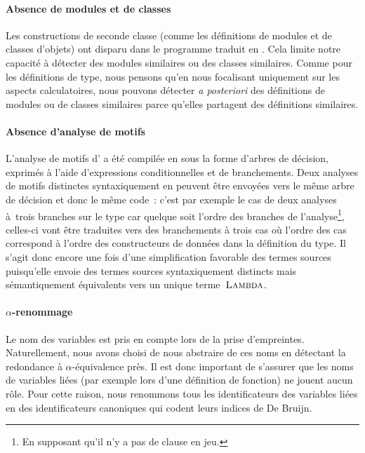 \paragraph{Absence de modules et de classes}
Les constructions de seconde classe (comme les définitions de modules
et de classes d'objets) ont disparu dans le programme traduit en
{\LambdaCode}. Cela limite notre capacité à détecter des modules
similaires ou des classes similaires. Comme pour les définitions de
type, nous pensons qu'en nous focalisant uniquement sur les aspects
calculatoires, nous pouvons détecter \textit{a posteriori} des
définitions de modules ou de classes similaires parce qu'elles
partagent des définitions similaires.

\paragraph{Absence d'analyse de motifs}
L'analyse de motifs d'{\OCaml} a été compilée en {\LambdaCode} sous la
forme d'arbres de décision, exprimés à l'aide d'expressions
conditionnelles et de branchements. Deux analyses de motifs distinctes
syntaxiquement en {\OCaml} peuvent être envoyées vers le même arbre de
décision et donc le même code~\LambdaCode: c'est par exemple le cas de deux
analyses à~trois branches sur le type  car quelque soit l'ordre des branches de
l'analyse\footnote{En supposant qu'il n'y a pas de clause
   en jeu.}, celles-ci vont être traduites vers des
branchements à trois cas où l'ordre des cas correspond à l'ordre des
constructeurs de données dans la définition du type. Il s'agit donc
encore une fois d'une simplification favorable des termes sources
puisqu'elle envoie des termes sources syntaxiquement distincts mais
sémantiquement équivalents vers un unique terme~$\textsc{Lambda}$.

\paragraph{$\alpha$-renommage}

Le nom des variables est pris en compte lors de la prise d'empreintes.
Naturellement, nous avons choisi de nous abstraire de ces noms en
détectant la redondance à $\alpha$-équivalence près. Il est donc
important de s'assurer que les noms de variables liées (par exemple
lors d'une définition de fonction) ne jouent aucun rôle. Pour cette
raison, nous renommons tous les identificateurs des variables liées en
des identificateurs canoniques qui codent leurs indices de De Bruijn.

